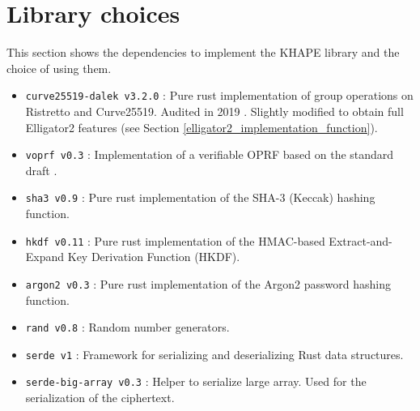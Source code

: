 ﻿\documentclass[../report.tex]{subfiles}
\begin{document}
% 
% 
% 
% 
% 
% 
% 
% 
% 
% 
% 
% 

\section{Library choices}
This section shows the dependencies to implement the KHAPE library and the choice of using them.
\begin{itemize}
 \item \verb|curve25519-dalek v3.2.0| : Pure rust implementation of group operations on Ristretto and Curve25519. Audited in 2019 \cite{Curve25519_Dalek_Audit}. Slightly modified to obtain full Elligator2 features (see Section \ref{elligator2_implementation_function}).
 \item \verb|voprf v0.3| : Implementation of a verifiable OPRF based on the standard draft \cite{VOPRF_Standard_Draft}.
 \item \verb|sha3 v0.9| : Pure rust implementation of the SHA-3 (Keccak) hashing function.
 \item \verb|hkdf v0.11| : Pure rust implementation of the HMAC-based Extract-and-Expand Key Derivation Function (HKDF).
 \item \verb|argon2 v0.3| : Pure rust implementation of the Argon2 password hashing function.
\item \verb|rand v0.8| : Random number generators.
 \item \verb|serde v1| : Framework for serializing and deserializing Rust data structures.
 \item \verb|serde-big-array v0.3| : Helper to serialize large array. Used for the serialization of the ciphertext.
\end{itemize}
\end{document}
